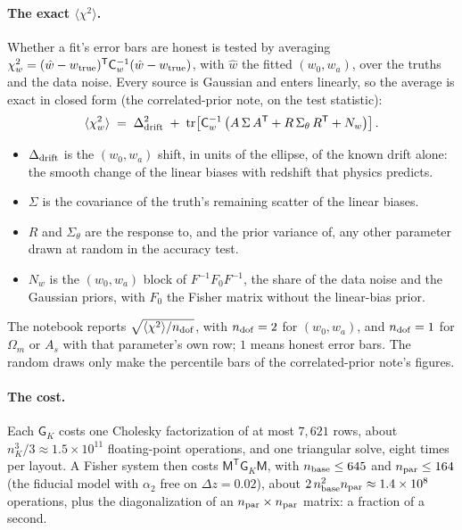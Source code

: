 \documentclass[11pt]{article}
\newcommand{\Cov}{\mathsf{C}}
\newcommand{\T}{^{\mathsf{T}}}
\newcommand{\chidof}{\sqrt{\langle\chi^2\rangle/n_{\rm dof}}}
\newcommand{\mM}{\mathsf{M}}
\newcommand{\mG}{\mathsf{G}}
\newcommand{\nbase}{n_{\rm base}}
\newcommand{\npar}{n_{\rm par}}
\begin{document}
\paragraph{The exact $\langle\chi^2\rangle$.}
Whether a fit's error bars are honest is tested by averaging
$\chi^2_w = (\hat{w} - w_{\rm true})\T \Cov_w^{-1}
(\hat{w} - w_{\rm true})$, with $\hat{w}$ the fitted $(w_0, w_a)$,
over the truths and the data noise.  Every source is Gaussian and
enters linearly, so the average is exact in closed form (the
correlated-prior note, on the test statistic):
\begin{equation}
  \langle \chi^2_w \rangle \;=\; \Delta_{\rm drift}^2
  \;+\; {\rm tr}\!\left[\Cov_w^{-1}\left(A\,\Sigma\,A\T
    + R\,\Sigma_\theta\,R\T + N_w\right)\right] .
  \label{eq:chi2}
\end{equation}
\begin{itemize}
  \item $\Delta_{\rm drift}$ is the $(w_0, w_a)$ shift, in units of the
    ellipse, of the known drift alone: the smooth change of the linear
    biases with redshift that physics predicts.
  \item $\Sigma$ is the covariance of the truth's remaining scatter of
    the linear biases.
  \item $R$ and $\Sigma_\theta$ are the response to, and the prior
    variance of, any other parameter drawn at random in the accuracy
    test.
  \item $N_w$ is the $(w_0, w_a)$ block of $F^{-1}F_0F^{-1}$, the share of
    the data noise and the Gaussian priors, with $F_0$ the Fisher matrix
    without the linear-bias prior.
\end{itemize}
The notebook reports $\chidof$, with $n_{\rm dof} = 2$ for $(w_0, w_a)$,
and $n_{\rm dof} = 1$ for $\Omega_m$ or $A_s$ with that parameter's own
row; $1$ means honest error bars.  The random draws only make the
percentile bars of the correlated-prior note's figures.

\paragraph{The cost.}
Each $\mG_K$ costs one Cholesky factorization of at most $7{,}621$
rows, about $n_K^3/3 \approx 1.5\times10^{11}$ floating-point
operations, and one triangular solve, eight times per layout.  A Fisher
system then costs $\mM\T\mG_K\mM$, with $\nbase \le 645$ and
$\npar \le 164$ (the fiducial model with $\alpha_2$ free on
$\Delta z = 0.02$), about
$2\,\nbase^2 \npar \approx 1.4\times10^{8}$ operations, plus the
diagonalization of an $\npar \times \npar$ matrix: a fraction of a
second.
\end{document}
